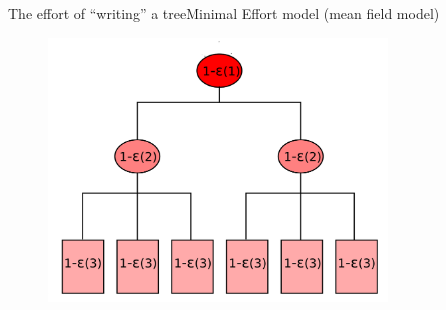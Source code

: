 \documentclass[11pt,svgnames]{beamer}
\begin{document}
\begin{frame}[noframenumbering]{The effort of ``writing'' a tree}{Minimal Effort model (mean field model)}
\begin{figure}[H]%
\includegraphics[width=9cm,draft=false]{immagini/ddd.pdf}
\end{figure}
\end{frame}
\end{document}

